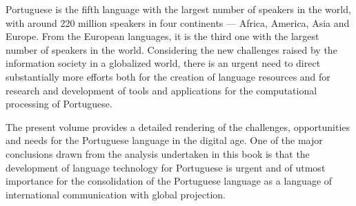 \begin{multicols}{2}
  Portuguese is the fifth language with the largest number of speakers in the world, with
  around 220 million speakers in four continents --- Africa, Ame\-ri\-ca, Asia and Europe.
  From the European languages, it is the third one with the largest number of speakers
  in the world. Considering the new challen\-ges raised by the information society in a globalized world,
  there is an urgent need to direct substantially more efforts both for the creation of language resources 
  and for research and development of tools and applications for the computational
  processing of Portuguese.

  The present volume provides a detailed rendering of the challenges, opportunities and needs for the Portuguese language in the digital age.
  One of the major conclusions drawn from the analysis undertaken in this book is that
  the development of language techno\-lo\-gy for Portuguese is urgent and of utmost importance
  for the consolidation of the Portuguese language as a language of international communication with global projection.

  \end{multicols}

  \clearpage


